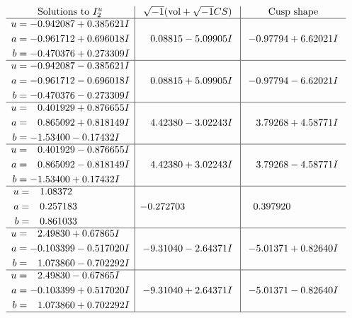\documentclass[1p]{elsarticle_modified}
\theoremstyle{definition}
\newcommand{\I}{\sqrt{-1}}
\begin{document}
$$\begin{array}{c|c|c}  
\text{Solutions to }I^u_{2}& \I (\text{vol} + \sqrt{-1}CS) & \text{Cusp shape}\\
 \hline 
\begin{aligned}
u &= -0.942087 + 0.385621 I \\
a &= -0.961712 + 0.696018 I \\
b &= -0.470376 + 0.273309 I\end{aligned}
 & \phantom{-}0.08815 - 5.09905 I & -0.97794 + 6.62021 I \\ \hline\begin{aligned}
u &= -0.942087 - 0.385621 I \\
a &= -0.961712 - 0.696018 I \\
b &= -0.470376 - 0.273309 I\end{aligned}
 & \phantom{-}0.08815 + 5.09905 I & -0.97794 - 6.62021 I \\ \hline\begin{aligned}
u &= \phantom{-}0.401929 + 0.876655 I \\
a &= \phantom{-}0.865092 + 0.818149 I \\
b &= -1.53400 - 0.17432 I\end{aligned}
 & \phantom{-}4.42380 - 3.02243 I & \phantom{-}3.79268 + 4.58771 I \\ \hline\begin{aligned}
u &= \phantom{-}0.401929 - 0.876655 I \\
a &= \phantom{-}0.865092 - 0.818149 I \\
b &= -1.53400 + 0.17432 I\end{aligned}
 & \phantom{-}4.42380 + 3.02243 I & \phantom{-}3.79268 - 4.58771 I \\ \hline\begin{aligned}
u &= \phantom{-}1.08372\phantom{ +0.000000I} \\
a &= \phantom{-}0.257183\phantom{ +0.000000I} \\
b &= \phantom{-}0.861033\phantom{ +0.000000I}\end{aligned}
 & -0.272703\phantom{ +0.000000I} & \phantom{-}0.397920\phantom{ +0.000000I} \\ \hline\begin{aligned}
u &= \phantom{-}2.49830 + 0.67865 I \\
a &= -0.103399 - 0.517020 I \\
b &= \phantom{-}1.073860 - 0.702292 I\end{aligned}
 & -9.31040 - 2.64371 I & -5.01371 + 0.82640 I \\ \hline\begin{aligned}
u &= \phantom{-}2.49830 - 0.67865 I \\
a &= -0.103399 + 0.517020 I \\
b &= \phantom{-}1.073860 + 0.702292 I\end{aligned}
 & -9.31040 + 2.64371 I & -5.01371 - 0.82640 I\\
 \hline 
 \end{array}$$\newpage\newpage\renewcommand{\arraystretch}{1}
\end{document}

